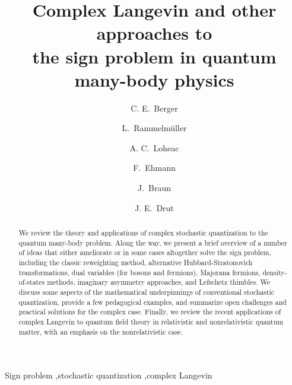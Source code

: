 \documentclass[3p]{elsarticle}
\begin{document}
\begin{frontmatter}

\title{Complex Langevin and other approaches to \\ the sign problem in quantum many-body physics}

\author[unc]{C. E.~Berger}

\author[tud,gsi]{L.~Rammelm\"uller}

\author[unc]{A. C.~Loheac}

\author[tud]{F.~Ehmann}

\author[tud,emmi,fair]{J.~Braun}

\author[unc]{J. E.~Drut}

\address[unc]{Department of Physics and Astronomy, University of North Carolina, Chapel Hill, North Carolina 27599, USA}
\address[tud]{Institut f\"ur Kernphysik (Theoriezentrum), Technische Universit\"at Darmstadt, D-64289 Darmstadt, Germany}
\address[gsi]{GSI Helmholtzzentrum f\"ur Schwerionenforschung GmbH, Planckstra\ss e 1, D-64291 Darmstadt, Germany}
\address[fair]{FAIR, Facility for Antiproton and Ion Research in Europe GmbH, Planckstra\ss e 1, D-64291   Darmstadt, Germany}
\address[emmi]{ExtreMe Matter Institute EMMI, GSI, Planckstra{\ss}e 1, D-64291 Darmstadt, Germany}

\begin{abstract}
We review the theory and applications of complex stochastic quantization to the quantum many-body problem.
Along the way, we present a brief overview of a number of ideas that either ameliorate or in some cases altogether solve the sign
problem, including the classic reweighting method, alternative Hubbard-Stratonovich transformations, dual variables (for
bosons and fermions), Majorana fermions, density-of-states methods, imaginary asymmetry approaches, and
Lefschetz thimbles. We discuss some aspects of 
the mathematical underpinnings of conventional stochastic quantization, provide a few pedagogical examples,
and summarize open challenges and practical solutions for the complex case. Finally, we review the recent applications of complex Langevin
to quantum field theory in relativistic and nonrelativistic quantum matter, with an emphasis on the nonrelativistic case.
\end{abstract}

\begin{keyword}
Sign problem \sep stochastic quantization \sep complex Langevin %
\end{keyword}

\end{frontmatter}
\end{document}
